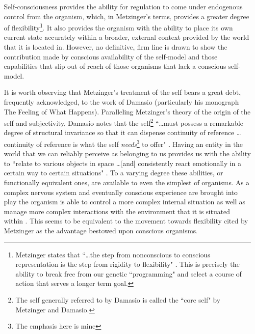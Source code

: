 Self-consciousness provides the ability for regulation to come under endogenous control from the organism, which, in Metzinger's terms, provides a greater degree of flexibility\footnote{Metzinger states that ``\ldots the step from nonconscious to conscious representation is the step from rigidity to flexibility" \cite[p. 348]{metzinger2003}. This is precisely the ability to break free from our genetic ``programming" and select a course of action that serves a longer term goal.}. It also provides the organism with the ability to place its own current state accurately within a broader, external context provided by the world that it is located in. However, no definitive, firm line is drawn to show the contribution made by conscious availability of the self-model and those capabilities that slip out of reach of those organisms that lack a conscious self-model.

It is worth observing that Metzinger's treatment of the self bears a great debt, frequently acknowledged, to the work of Damasio (particularly his monograph The Feeling of What Happens). Paralleling Metzinger's theory of the origin of the self and subjectivity, Damasio notes that the self\footnote{The self generally referred to by Damasio is called the ``core self" by Metzinger and Damasio.} ``\ldots must possess a remarkable degree of structural invariance so that it can dispense continuity of reference \ldots continuity of reference is what the self \emph{needs}\footnote{The emphasis here is mine} to offer" \cite[p. 135]{damasio2000}. Having an entity in the world that we can reliably perceive as belonging to us provides us with the ability to ``relate to various objects in space \ldots [and] consistently react emotionally in a certain way to certain situations" \cite[p. 135]{damasio2000}. To a varying degree these abilities, or functionally equivalent ones, are available to even the simplest of organisms. As a complex nervous system and eventually conscious experience are brought into play the organism is able to control a more complex internal situation as well as manage more complex interactions with the environment that it is situated within \cite[p. 139]{damasio2000}. This seems to be equivalent to the movement towards flexibility cited by Metzinger as the advantage bestowed upon conscious organisms.

